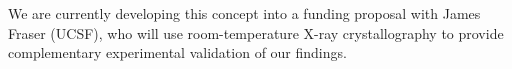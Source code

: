 \documentclass[10pt]{article}
\renewcommand{\baselinestretch}{1.1}
\begin{document}
We are currently developing this concept into a funding proposal with James Fraser (UCSF), who will use room-temperature X-ray crystallography to provide complementary experimental validation of our findings.


\eject
\footnotesize
\setlength{\parskip}{0em}
\renewcommand{\baselinestretch}{1.0}
 

\end{document}
